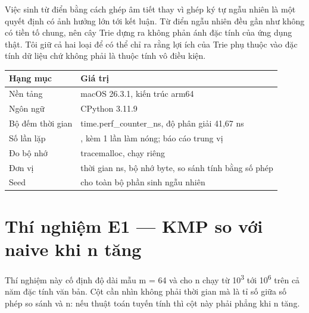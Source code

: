 Việc sinh từ điển bằng cách ghép âm tiết thay vì ghép ký tự ngẫu nhiên
là một quyết định có ảnh hưởng lớn tới kết luận. Từ điển ngẫu nhiên đều
gần như không có tiền tố chung, nên cây Trie dựng ra không phản ánh đặc
tính của ứng dụng thật. Tôi giữ cả hai loại để có thể chỉ ra rằng lợi
ích của Trie phụ thuộc vào đặc tính dữ liệu chứ không phải là thuộc tính
vô điều kiện.

\begin{center}
\end{center}

{\footnotesize\singlespacing
\begin{longtable}[]{@{}
  >{\raggedright\arraybackslash}p{}
  >{\raggedright\arraybackslash}p{}@{}}
\toprule\noalign{}
\begin{minipage}[b]{\linewidth}\raggedright
Hạng mục
\end{minipage} & \begin{minipage}[b]{\linewidth}\raggedright
Giá trị
\end{minipage} \\
\midrule\noalign{}
\endhead
\bottomrule\noalign{}
\endlastfoot
Nền tảng & macOS 26.3.1, kiến trúc arm64 \\
Ngôn ngữ & CPython 3.11.9 \\
Bộ đếm thời gian & time.perf\_counter\_ns, độ phân giải 41,67 ns \\
Số lần lặp & 7, kèm 1 lần làm nóng; báo cáo trung vị \\
Đo bộ nhớ & tracemalloc, chạy riêng \\
Đơn vị & thời gian ns, bộ nhớ byte, so sánh tính bằng số phép \\
Seed & 20260728 cho toàn bộ phần sinh ngẫu nhiên \\
\end{longtable}
}

\section{Thí nghiệm E1 --- KMP so với naive khi n tăng}
\label{sec:6-4}

Thí nghiệm này cố định độ dài mẫu m = 64 và cho n chạy từ 10\textsuperscript{3} tới 10\textsuperscript{6}
trên cả năm đặc tính văn bản. Cột cần nhìn không phải thời gian mà là tỉ
số giữa số phép so sánh và n: nếu thuật toán tuyến tính thì cột này phải
phẳng khi n tăng.

